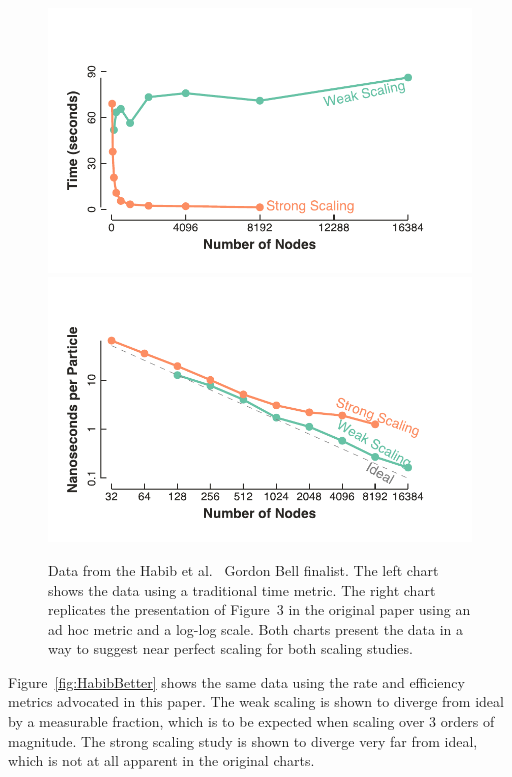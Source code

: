 \documentclass{llncs}
\newcommand*{\scite}[1]{~\cite{#1}}
\newcommand{\etal}{et al.\xspace}
\begin{document}
\begin{figure}[htb]
  \centering
  \includegraphics[width=.48\linewidth]{images/HabibTime}\quad
  \includegraphics[width=.48\linewidth]{images/HabibTimePerParticle}
  \caption{Data from the Habib \etal\scite{Habib2013} Gordon Bell
    finalist. The left chart shows the data using a traditional time
    metric. The right chart replicates the presentation of Figure~3 in the
    original paper using an ad hoc metric and a log-log
    scale. Both charts present the data in a way to suggest near perfect
    scaling for both scaling studies.}
  \label{fig:HabibTraditional}
\end{figure}

Figure~\ref{fig:HabibBetter} shows the same data using the rate and
efficiency metrics advocated in this paper. The weak scaling is shown to
diverge from ideal by a measurable fraction, which is to be expected when
scaling over 3 orders of magnitude. The strong scaling study is shown to
diverge very far from ideal, which is not at all apparent in the original
charts.
\end{document}
